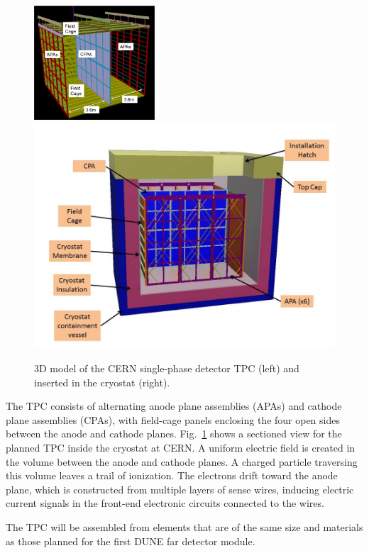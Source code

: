 \begin{figure}[htb]
\centering
\begin{minipage}[b]{1.0\textwidth}
\begin{center}
\includegraphics[width=0.40\textwidth]{figures/CERN_single_TPC}
\includegraphics[width=.59\textwidth]{figures/TPC-3D-section.jpg}
\end{center}
\end{minipage}
\caption{\small 3D model of the CERN single-phase detector TPC (left) and inserted in the cryostat (right).}
\label{fig:CERNdet-overview}
\end{figure}

The TPC consists of alternating anode plane assemblies (APAs) and cathode plane assemblies (CPAs), with field-cage panels enclosing the four open sides between the anode and cathode planes.  Fig.~\ref{fig:CERNdet-overview} shows a sectioned view for the planned TPC inside the cryostat at CERN.  A uniform electric field is created in the volume between the anode and cathode planes. A charged particle traversing this volume leaves a trail of ionization. The electrons drift toward the anode plane, which is constructed from multiple layers of sense wires, inducing electric current signals in the front-end electronic circuits connected to the wires.

The TPC will be assembled from elements that are of the same size and materials as those planned for the first DUNE far detector module.  

